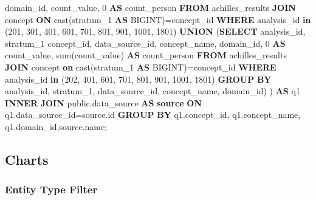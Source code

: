 \documentclass[]{book}
\newenvironment{Shaded}{\begin{snugshade}}{\end{snugshade}}
\newcommand{\KeywordTok}[1]{\textcolor[rgb]{0.13,0.29,0.53}{\textbf{#1}}}
\newcommand{\DecValTok}[1]{\textcolor[rgb]{0.00,0.00,0.81}{#1}}
\newcommand{\FunctionTok}[1]{\textcolor[rgb]{0.00,0.00,0.00}{#1}}
\newcommand{\NormalTok}[1]{#1}
\begin{document}
\begin{Shaded}
\begin{Highlighting}[]
\NormalTok{             domain_id,}
\NormalTok{             count_value, }\DecValTok{0} \KeywordTok{AS}\NormalTok{ count_person}
    \KeywordTok{FROM}\NormalTok{ achilles_results}
    \KeywordTok{JOIN}\NormalTok{ concept }\KeywordTok{ON} \FunctionTok{cast}\NormalTok{(stratum_1 }\KeywordTok{AS}\NormalTok{ BIGINT)=concept_id}
    \KeywordTok{WHERE}\NormalTok{ analysis_id }\KeywordTok{in}\NormalTok{ (}\DecValTok{201}\NormalTok{, }\DecValTok{301}\NormalTok{, }\DecValTok{401}\NormalTok{, }\DecValTok{601}\NormalTok{, }\DecValTok{701}\NormalTok{, }\DecValTok{801}\NormalTok{, }\DecValTok{901}\NormalTok{, }\DecValTok{1001}\NormalTok{, }
        \DecValTok{1801}\NormalTok{)}
    \KeywordTok{UNION}\NormalTok{ (}\KeywordTok{SELECT}\NormalTok{  analysis_id,}
\NormalTok{                   stratum_1 concept_id,}
\NormalTok{                   data_source_id,}
\NormalTok{                   concept_name,}
\NormalTok{                   domain_id,}
                   \DecValTok{0} \KeywordTok{AS}\NormalTok{ count_value,}
                   \FunctionTok{sum}\NormalTok{(count_value) }\KeywordTok{AS}\NormalTok{ count_person}
            \KeywordTok{FROM}\NormalTok{  achilles_results}
            \KeywordTok{JOIN}\NormalTok{ concept }\KeywordTok{on} \FunctionTok{cast}\NormalTok{(stratum_1 }\KeywordTok{AS}\NormalTok{ BIGINT)=concept_id}
            \KeywordTok{WHERE}\NormalTok{ analysis_id }\KeywordTok{in}\NormalTok{ (}\DecValTok{202}\NormalTok{, }\DecValTok{401}\NormalTok{, }\DecValTok{601}\NormalTok{, }\DecValTok{701}\NormalTok{, }\DecValTok{801}\NormalTok{, }\DecValTok{901}\NormalTok{, }
                \DecValTok{1001}\NormalTok{, }\DecValTok{1801}\NormalTok{)}
            \KeywordTok{GROUP} \KeywordTok{BY}\NormalTok{ analysis_id, stratum_1, data_source_id, }
\NormalTok{                concept_name, domain_id) ) }\KeywordTok{AS}\NormalTok{ q1}
    \KeywordTok{INNER} \KeywordTok{JOIN}\NormalTok{ public.data_source }\KeywordTok{AS} \KeywordTok{source} \KeywordTok{ON} 
\NormalTok{        q1.data_source_id=source.id}
\KeywordTok{GROUP} \KeywordTok{BY}\NormalTok{ q1.concept_id, q1.concept_name, q1.domain_id,source.name;}
\end{Highlighting}
\end{Shaded}

\subsection{Charts}\label{charts}

\subsubsection{Entity Type Filter}\label{entity-type-filter}
\end{document}

